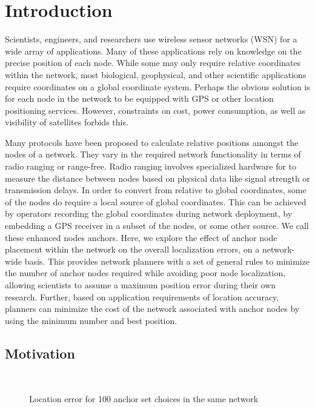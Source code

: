 
\chapter{Introduction}

Scientists, engineers, and researchers use wireless sensor networks (WSN) for a wide array of applications. Many of these applications rely on knowledge on the precise position of each node. While some may only require relative coordinates within the network, most biological, geophysical, and other scientific applications require coordinates on a global coordinate system. Perhaps the obvious solution is for each node in the network to be equipped with GPS or other location positioning services.  However, constraints on cost, power consumption, as well as visibility of satellites forbids this.  

Many protocols have been proposed\cite{APS,MDS-MAP,CCA-MAP07} to calculate relative positions amongst the nodes of a network.  They vary in the required network functionality in terms of radio ranging or range-free.  Radio ranging involves specialized hardware for to measure the distance between nodes based on physical data like signal strength or transmission delays.  In order to convert from relative to global coordinates, some of the nodes do require a local source of global coordinates.  This can be achieved by operators recording the global coordinates during network deployment, by embedding a GPS receiver in a subset of the nodes, or some other source.  We call these enhanced nodes anchors.  Here, we explore the effect of anchor node placement within the network on the overall localization errors, on a network-wide basis. This provides network planners with a set of general rules to minimize the number of anchor nodes required while avoiding poor node localization, allowing scientists to assume a maximum position error during their own research.  Further, based on application requirements of location accuracy, planners can minimize the cost of the network associated with anchor nodes by using the minimum number and best position.

\section{Motivation} 
\begin{figure}
  \centering
    \\
    \caption{Location error for 100 anchor set choices in the same network}
    \label{fig:Motivation}
\end{figure}

